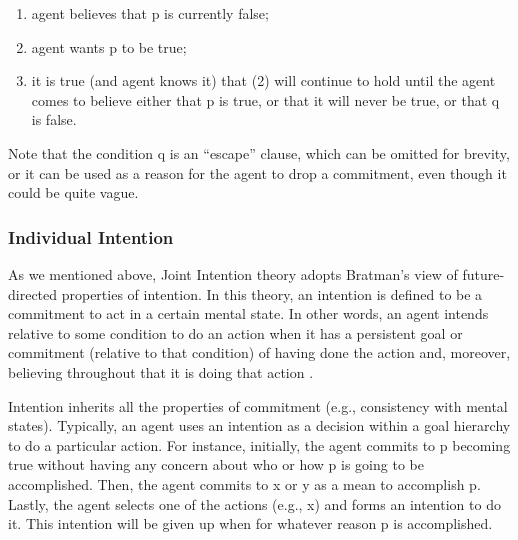 \documentclass[12pt]{report}
\begin{document}
\begin{enumerate}
  \item agent believes that p is currently false;
  \item agent wants p to be true;
  \item it is true (and agent knows it) that (2) will continue to hold until the
  agent comes to believe either that p is true, or that it will never be true,
  or that q is false.
\end{enumerate}

Note that the condition q is an ``escape'' clause, which can be omitted for
brevity, or it can be used as a reason for the agent to drop a commitment, even
though it could be quite vague.

\subsubsection{Individual Intention}
\label{sec:individual-intention}

As we mentioned above, Joint Intention theory adopts Bratman's view of
future-directed properties of intention. In this theory, an intention is defined
to be a commitment to act in a certain mental state. In other words, an agent
intends relative to some condition to do an action when it has a persistent goal
or commitment (relative to that condition) of having done the action and,
moreover, believing throughout that it is doing that action
\cite{cohen:teamwork}.

Intention inherits all the properties of commitment (e.g., consistency with
mental states). Typically, an agent uses an intention as a decision within a
goal hierarchy to do a particular action. For instance, initially, the agent
commits to p becoming true without having any concern about who or how p is
going to be accomplished. Then, the agent commits to x or y as a mean to
accomplish p. Lastly, the agent selects one of the actions (e.g., x) and forms
an intention to do it. This intention will be given up when for whatever reason
p is accomplished.

% 
\end{document}
